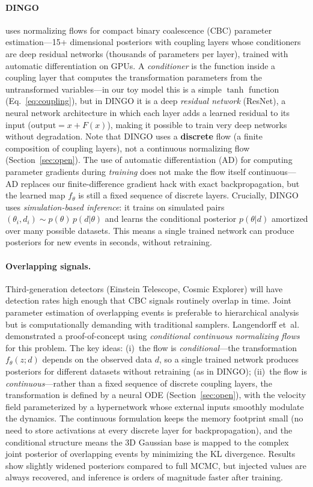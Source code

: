 \documentclass[11pt,letterpaper]{article}
\begin{document}
\paragraph{DINGO} \cite{dax2021} uses normalizing flows for compact
binary coalescence (CBC) parameter estimation---15+ dimensional
posteriors with coupling layers whose conditioners are deep residual
networks (thousands of parameters per layer), trained with automatic
differentiation on GPUs.
A \emph{conditioner} is the function inside a coupling layer that
computes the transformation parameters from the untransformed
variables---in our toy model this is a simple $\tanh$ function
(Eq.~\ref{eq:coupling}), but in DINGO it is a deep
\emph{residual network} (ResNet), a neural network architecture in
which each layer adds a learned residual to its input
($\mathrm{output} = x + F(x)$), making it possible to train very deep
networks without degradation.
Note that DINGO uses a \textbf{discrete} flow (a finite composition of
coupling layers), not a continuous normalizing flow
(Section~\ref{sec:open}).
The use of automatic differentiation (AD) for computing parameter
gradients during \emph{training} does not make the flow itself
continuous---AD replaces our finite-difference gradient hack with exact
backpropagation, but the learned map $f_\theta$ is still a fixed
sequence of discrete layers.
Crucially, DINGO uses \emph{simulation-based inference}: it trains on
simulated pairs $(\theta_i, d_i) \sim p(\theta)\,p(d|\theta)$ and
learns the conditional posterior $p(\theta | d)$ amortized over many
possible datasets.
This means a single trained network can produce posteriors for new
events in seconds, without retraining.

\paragraph{Overlapping signals.}
Third-generation detectors (Einstein Telescope, Cosmic Explorer) will
have detection rates high enough that CBC signals routinely overlap in
time.
Joint parameter estimation of overlapping events is preferable to
hierarchical analysis but is computationally demanding with traditional
samplers.
Langendorff et~al.\ \cite{langendorff2023} demonstrated a
proof-of-concept using \emph{conditional continuous normalizing flows}
for this problem.
The key ideas: (i)~the flow is \emph{conditional}---the transformation
$f_\theta(z; d)$ depends on the observed data $d$, so a single trained
network produces posteriors for different datasets without retraining
(as in DINGO); (ii)~the flow is \emph{continuous}---rather than a
fixed sequence of discrete coupling layers, the transformation is
defined by a neural ODE (Section~\ref{sec:open}), with the velocity
field parameterized by a hypernetwork whose external inputs smoothly
modulate the dynamics.
The continuous formulation keeps the memory footprint small (no need to
store activations at every discrete layer for backpropagation), and
the conditional structure means the 3D Gaussian base is mapped to the
complex joint posterior of overlapping events by minimizing the KL
divergence.
Results show slightly widened posteriors compared to full MCMC, but
injected values are always recovered, and inference is orders of
magnitude faster after training.
\end{document}
